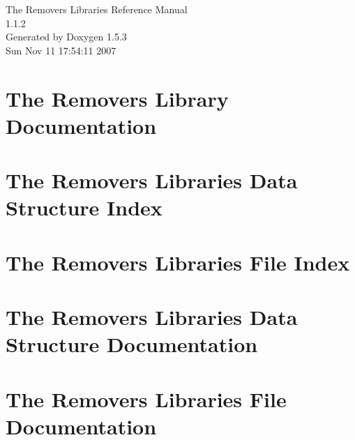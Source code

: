 \documentclass[a4paper]{book}
\begin{document}
\begin{titlepage}
\vspace*{7cm}
\begin{center}
{\Large The Removers Libraries Reference Manual\\[1ex]\large 1.1.2 }\\
\vspace*{1cm}
{\large Generated by Doxygen 1.5.3}\\
\vspace*{0.5cm}
{\small Sun Nov 11 17:54:11 2007}\\
\end{center}
\end{titlepage}
\clearemptydoublepage
{}
\tableofcontents
\clearemptydoublepage
{}
\chapter{The Removers Library Documentation }
\label{index}\hypertarget{index}{}
\chapter{The Removers Libraries Data Structure Index}

\chapter{The Removers Libraries File Index}

\chapter{The Removers Libraries Data Structure Documentation}








\chapter{The Removers Libraries File Documentation}












\printindex
\end{document}
